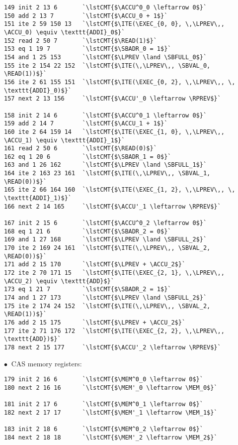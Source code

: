 \begin{lstlisting}[style=btor2]
149 init 2 13 6       `\lstCMT{$\ACCU^0_0 \leftarrow 0$}`
150 add 2 13 7        `\lstCMT{$\ACCU_0 + 1$}`
151 ite 2 59 150 13   `\lstCMT{$\ITE(\EXEC_{0, 0}, \,\LPREV\,, \ACCU_0) \equiv \texttt{ADDI}_0$}`
152 read 2 50 7       `\lstCMT{$\READ(1)$}`
153 eq 1 19 7         `\lstCMT{$\SBADR_0 = 1$}`
154 and 1 25 153      `\lstCMT{$\LPREV \land \SBFULL_0$}`
155 ite 2 154 22 152  `\lstCMT{$\ITE(\,\LPREV\,, \SBVAL_0, \READ(1))$}`
156 ite 2 61 155 151  `\lstCMT{$\ITE(\EXEC_{0, 2}, \,\LPREV\,, \, \texttt{ADDI}_0)$}`
157 next 2 13 156     `\lstCMT{$\ACCU'_0 \leftarrow \RPREV$}`

158 init 2 14 6       `\lstCMT{$\ACCU^0_1 \leftarrow 0$}`
159 add 2 14 7        `\lstCMT{$\ACCU_1 + 1$}`
160 ite 2 64 159 14   `\lstCMT{$\ITE(\EXEC_{1, 0}, \,\LPREV\,, \ACCU_1) \equiv \texttt{ADDI}_1$}`
161 read 2 50 6       `\lstCMT{$\READ(0)$}`
162 eq 1 20 6         `\lstCMT{$\SBADR_1 = 0$}`
163 and 1 26 162      `\lstCMT{$\LPREV \land \SBFULL_1$}`
164 ite 2 163 23 161  `\lstCMT{$\ITE(\,\LPREV\,, \SBVAL_1, \READ(0))$}`
165 ite 2 66 164 160  `\lstCMT{$\ITE(\EXEC_{1, 2}, \,\LPREV\,, \, \texttt{ADDI}_1)$}`
166 next 2 14 165     `\lstCMT{$\ACCU'_1 \leftarrow \RPREV$}`

167 init 2 15 6       `\lstCMT{$\ACCU^0_2 \leftarrow 0$}`
168 eq 1 21 6         `\lstCMT{$\SBADR_2 = 0$}`
169 and 1 27 168      `\lstCMT{$\LPREV \land \SBFULL_2$}`
170 ite 2 169 24 161  `\lstCMT{$\ITE(\,\LPREV\,, \SBVAL_2, \READ(0))$}`
171 add 2 15 170      `\lstCMT{$\LPREV + \ACCU_2$}`
172 ite 2 70 171 15   `\lstCMT{$\ITE(\EXEC_{2, 1}, \,\LPREV\,, \ACCU_2) \equiv \texttt{ADD}$}`
173 eq 1 21 7         `\lstCMT{$\SBADR_2 = 1$}`
174 and 1 27 173      `\lstCMT{$\LPREV \land \SBFULL_2$}`
175 ite 2 174 24 152  `\lstCMT{$\ITE(\,\LPREV\,, \SBVAL_2, \READ(1))$}`
176 add 2 15 175      `\lstCMT{$\LPREV + \ACCU_2$}`
177 ite 2 71 176 172  `\lstCMT{$\ITE(\EXEC_{2, 2}, \,\LPREV\,, \texttt{ADD})$}`
178 next 2 15 177     `\lstCMT{$\ACCU'_2 \leftarrow \RPREV$}`
\end{lstlisting}

\noindent
$\bullet\ $ CAS memory registers:
\begin{lstlisting}[style=btor2]
179 init 2 16 6       `\lstCMT{$\MEM^0_0 \leftarrow 0$}`
180 next 2 16 16      `\lstCMT{$\MEM'_0 \leftarrow \MEM_0$}`

181 init 2 17 6       `\lstCMT{$\MEM^0_1 \leftarrow 0$}`
182 next 2 17 17      `\lstCMT{$\MEM'_1 \leftarrow \MEM_1$}`

183 init 2 18 6       `\lstCMT{$\MEM^0_2 \leftarrow 0$}`
184 next 2 18 18      `\lstCMT{$\MEM'_2 \leftarrow \MEM_2$}`
\end{lstlisting}

